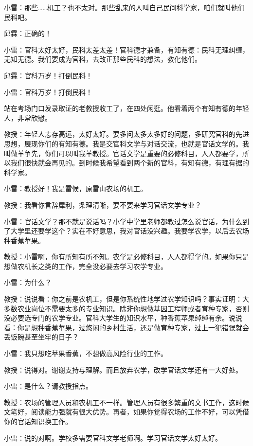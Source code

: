 \documentclass[UTF8,12pt,oneside]{ctexbook}
\begin{document}
    小雷：那些……机工？也不太对。那些乱来的人叫自己民间科学家，咱们就叫他们民科吧。
    
    邱霖：正确的！
    
    小雷：官科太好太好，民科太差太差！官科德才兼备，有知有德：民科无理纠缠，无知无德。我们要成为官科，去改正那些民科的想法，教化他们。
    
    邱霖：官科万岁！打倒民科！
    
    小雷：官科万岁！打倒民科！
    
    \fangsong
    站在考场门口发录取证的老教授收工了，在四处闲逛。他看着两个有知有德的年轻人，非常欣慰。
    
    \songti
     教授：年轻人志存高远，太好太好。要多问太多太多好的问题，多研究官科的先进思想，展现你们的有知有德。我是交官科文学与对话交流，也就是官话文学的。我叫做羊争先，你们可以叫我羊教授。官话文学是重要的必修科目，人人都要学，所以我们很快就会再见的。到时候我希望看到两个新的官科，有知有德，有理有据的科学家。
     
     小雷：教授好！我是雷候，原雷山农场的机工。
     
     教授：我看你言辞犀利，条理清晰，要不要来学习官话文学专业？
     
     小雷：官话文学？那不就是说话吗？小学中学里老师都教过怎么说官话，为什么到了大学里还要学这个？实在不好意思，我对官话没兴趣。我要学农学，以后去农场种香蕉苹果。
     
     教授：小雷啊，你有所知有所不知。农学是必修科目，人人都得学的。如果你只是想做农机长之类的工作，完全没必要去学习农学专业。
     
     小雷：为什么？
     
     教授：说说看：你之前是农机工，但是你系统性地学过农学知识吗？事实证明：大多数农业岗位不需要太多的专业知识。除非你想做基因工程师或者育种专家，否则没必要选专门的农学专业。官科大学生的知识水平，种香蕉苹果绰绰有余。说说看：你是想种香蕉苹果，过悠闲的乡村生活，还是做育种专家，过上一犯错误就会丢饭碗甚至坐牢的日子？
     
     小雷：我只想吃苹果香蕉，不想做高风险行业的工作。
     
     教授：说得对。谢谢支持与理解。而且放弃农学，改学官话文学还有一大好处。
     
     小雷：是什么？请教授指点。
     
     教授：农场的管理人员和农机工不一样。管理人员有很多繁重的文书工作，这时候文笔好，阅读能力强就有很大优势。再者，如果你觉得农场的工作不好，可以凭借你的官话知识换工作。
    
    小雷：说的对啊。学校多需要官科文学老师啊。学习官话文学太好太好。
    
\end{document}
